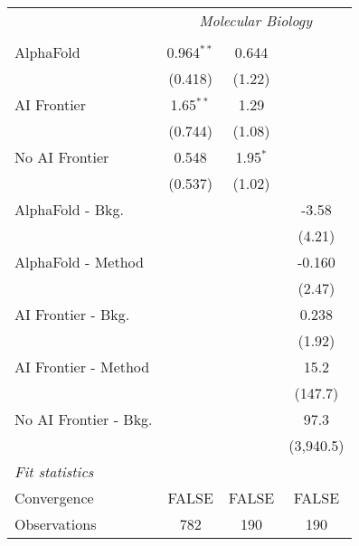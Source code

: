 \begin{tabular}{lccc}
 & \multicolumn{3}{c}{\textit{Molecular Biology}} \\ \\
   AlphaFold             & 0.964$^{**}$ & 0.644      &   \\   
                         & (0.418)      & (1.22)     &   \\   
   AI Frontier           & 1.65$^{**}$  & 1.29       &   \\   
                         & (0.744)      & (1.08)     &   \\   
   No AI Frontier        & 0.548        & 1.95$^{*}$ &   \\   
                         & (0.537)      & (1.02)     &   \\   
   AlphaFold - Bkg.      &              &            & -3.58\\   
                         &              &            & (4.21)\\   
   AlphaFold - Method    &              &            & -0.160\\   
                         &              &            & (2.47)\\   
   AI Frontier - Bkg.    &              &            & 0.238\\   
                         &              &            & (1.92)\\   
   AI Frontier - Method  &              &            & 15.2\\   
                         &              &            & (147.7)\\   
   No AI Frontier - Bkg. &              &            & 97.3\\   
                         &              &            & (3,940.5)\\   
   \midrule
   \emph{Fit statistics}\\
   Convergence           &FALSE         & FALSE      & FALSE\\  
   Observations          & 782          & 190        & 190\\  
   

\end{tabular}
